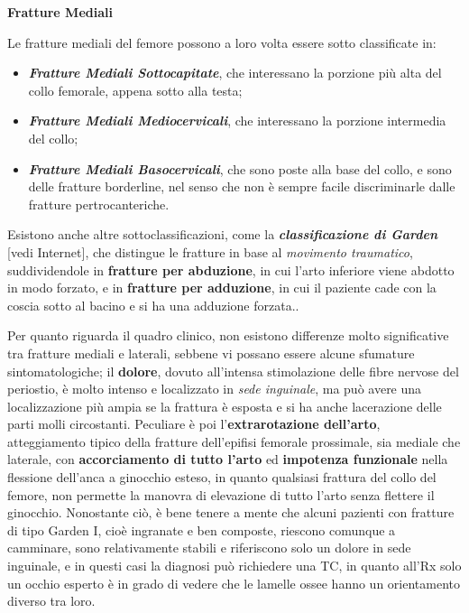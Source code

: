 \documentclass[]{article}
\begin{document}
\textbf{Fratture Mediali}

Le fratture mediali del femore possono a loro volta essere sotto
classificate in:

\begin{itemize}
\item
  \textbf{\emph{Fratture Mediali Sottocapitate}}, che interessano la
  porzione più alta del collo femorale, appena sotto alla testa;
\item
  \textbf{\emph{Fratture Mediali Mediocervicali}}, che interessano la
  porzione intermedia del collo;
\item
  \textbf{\emph{Fratture Mediali Basocervicali}}, che sono poste alla
  base del collo, e sono delle fratture borderline, nel senso che non è
  sempre facile discriminarle dalle fratture pertrocanteriche.
\end{itemize}

Esistono anche altre sottoclassificazioni, come la
\textbf{\emph{classificazione di Garden}} {[}vedi Internet{]}, che
distingue le fratture in base al \emph{movimento traumatico},
suddividendole in \textbf{fratture per abduzione}, in cui l'arto
inferiore viene abdotto in modo forzato, e in \textbf{fratture per
adduzione}, in cui il paziente cade con la coscia sotto al bacino e si
ha una adduzione forzata..

Per quanto riguarda il quadro clinico, non esistono differenze molto
significative tra fratture mediali e laterali, sebbene vi possano essere
alcune sfumature sintomatologiche; il \textbf{dolore}, dovuto
all'intensa stimolazione delle fibre nervose del periostio, è molto
intenso e localizzato in \emph{sede inguinale}, ma può avere una
localizzazione più ampia se la frattura è esposta e si ha anche
lacerazione delle parti molli circostanti. Peculiare è poi
l'\textbf{extrarotazione dell'arto}, atteggiamento tipico della fratture
dell'epifisi femorale prossimale, sia mediale che laterale, con
\textbf{accorciamento di tutto l'arto} ed \textbf{impotenza funzionale}
nella flessione dell'anca a ginocchio esteso, in quanto qualsiasi
frattura del collo del femore, non permette la manovra di elevazione di
tutto l'arto senza flettere il ginocchio. Nonostante ciò, è bene tenere
a mente che alcuni pazienti con fratture di tipo Garden I, cioè
ingranate e ben composte, riescono comunque a camminare, sono
relativamente stabili e riferiscono solo un dolore in sede inguinale, e
in questi casi la diagnosi può richiedere una TC, in quanto all'Rx solo
un occhio esperto è in grado di vedere che le lamelle ossee hanno un
orientamento diverso tra loro.
\end{document}
